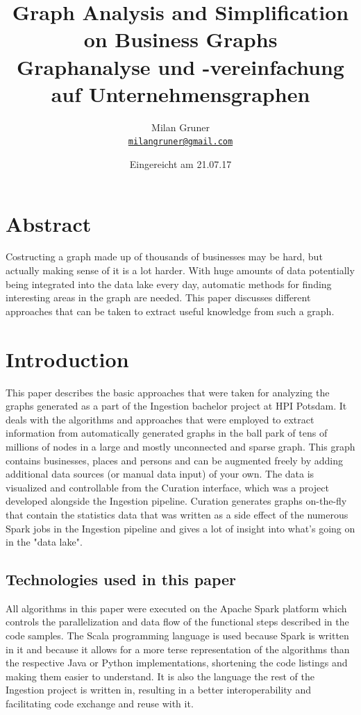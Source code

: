 \documentclass[
        a4paper,     %
        titlepage,   %
        oneside,     %
        parskip      %
]{scrartcl}          %
\title{
  Graph Analysis and Simplification on Business Graphs
  \\ \bigskip
  \large{Graphanalyse und -vereinfachung auf Unternehmensgraphen}
}
\author{Milan Gruner\\\small{\href{mailto:milangruner@gmail.com}{\nolinkurl{milangruner@gmail.com}}}}
\date{Eingereicht am 21.07.17}
\begin{document}
  \maketitle %
  \clearpage %

  \section*{Abstract}
  { \large
    Costructing a graph made up of thousands of businesses may be hard, but actually making sense of it is a lot harder.
    With huge amounts of data potentially being integrated into the data lake every day, automatic methods for finding interesting areas in the graph are needed.
    This paper discusses different approaches that can be taken to extract useful knowledge from such a graph.
  }

  \clearpage
  \tableofcontents
  \pagebreak


  \section{Introduction}
    This paper describes the basic approaches that were taken for analyzing the
    graphs generated as a part of the Ingestion bachelor project at HPI Potsdam.
    It deals with the algorithms and approaches that were employed to extract
    information from automatically generated graphs in the ball park of
    tens of millions of nodes in a large and mostly unconnected and sparse graph.
    This graph contains businesses, places and persons and can be augmented freely by adding
    additional data sources (or manual data input) of your own. The data is visualized and controllable from the
    Curation interface, which was a project developed alongside the Ingestion pipeline.
    Curation generates graphs on-the-fly that contain the statistics data that was written
    as a side effect of the numerous Spark jobs in the Ingestion pipeline and gives
    a lot of insight into what's going on in the "data lake".

    \subsection{Technologies used in this paper}
    All algorithms in this paper were executed on the Apache Spark platform which
    controls the parallelization and data flow of the functional steps described
    in the code samples. The Scala programming language is used because Spark is
    written in it and because it allows for a more terse representation of the
    algorithms than the respective Java or Python implementations, shortening
    the code listings and making them easier to understand. It is also the language
    the rest of the Ingestion project is written in, resulting in a better interoperability
    and facilitating code exchange and reuse with it.
\end{document}
